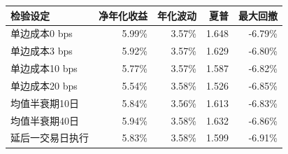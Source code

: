 \begin{tabular}{lrrrr}
\toprule
检验设定 & 净年化收益 & 年化波动 & 夏普 & 最大回撤\\\midrule
单边成本0 bps & 5.99\% & 3.57\% & 1.648 & -6.79\%\\
单边成本3 bps & 5.92\% & 3.57\% & 1.629 & -6.80\%\\
单边成本10 bps & 5.77\% & 3.57\% & 1.587 & -6.82\%\\
单边成本20 bps & 5.54\% & 3.58\% & 1.526 & -6.85\%\\
均值半衰期10日 & 5.84\% & 3.56\% & 1.613 & -6.83\%\\
均值半衰期40日 & 5.94\% & 3.58\% & 1.632 & -6.86\%\\
延后一交易日执行 & 5.83\% & 3.58\% & 1.599 & -6.91\%\\
\bottomrule
\end{tabular}